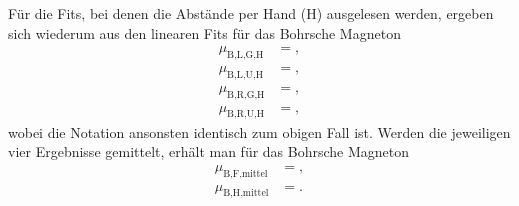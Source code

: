 Für die Fits, bei denen die Abstände per Hand (H) ausgelesen werden, ergeben sich wiederum aus den linearen Fits für das Bohrsche Magneton
\begin{align*}
  \mu_{\text{B,L,G,H}} &= ,\\
  \mu_{\text{B,L,U,H}} &= ,\\
  \mu_{\text{B,R,G,H}} &= ,\\
  \mu_{\text{B,R,U,H}} &= ,
\end{align*}
wobei die Notation ansonsten identisch zum obigen Fall ist.
Werden die jeweiligen vier Ergebnisse gemittelt, erhält man für das Bohrsche Magneton
\begin{align*}
  \mu_{\text{B,F,mittel}} &= ,\\
  \mu_{\text{B,H,mittel}} &= .
\end{align*}
